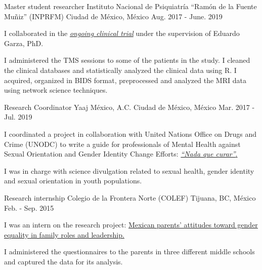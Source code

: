\begin{cventries}
{\begin{cvitems}
            \end{cvitems}
        }
    \cventry
        {Master student researcher}
        {Instituto Nacional de Psiquiatría ``Ramón de la Fuente Muñiz''
        (INPRFM)}
        {Ciudad de México, México}
        {Aug. 2017 - June. 2019}
        {
            \begin{cvitems}
                \item {I collaborated in the \href{https://clinicaltrials.gov/ct2/show/study/NCT02986438?term=Jorge+Gonzalez-Olvera&cntry=MX&rank=2} {\textit{ongoing clinical trial}} under the supervision of Eduardo Garza, PhD.}
                \item {I administered the TMS sessions to some of the patients in the study. I cleaned the clinical databases and statistically analyzed the clinical data using R. I acquired, organized in BIDS format, preprocessed and analyzed the MRI data using network science techniques.}
            \end{cvitems}
        }
    \cventry
        {Research Coordinator}
        {Yaaj México, A.C.}
        {Ciudad de México, México}
        {Mar. 2017 - Jul. 2019}
        {
            \begin{cvitems}
                \item {I coordinated a project in collaboration with United Nations Office on Drugs and Crime (UNODC) to write a guide for professionals of Mental Health against Sexual Orientation and Gender Identity Change Efforts:
                    \href{https://www.unodc.org/documents/mexicoandcentralamerica/2019/GUIAECOSIGFINAL-compressed.pdf}{\textit{``Nada que curar''}.}}
                \item {I was in charge with science divulgation related to sexual health, gender identity and sexual orientation in youth populations.}
            \end{cvitems}
        }
     \cventry
        {Research internship}
        {Colegio de la Frontera Norte (COLEF)}
        {Tijuana, BC, México}
        {Feb. - Sep. 2015}
        {
            \begin{cvitems}
                \item {I was an intern on the research project:
                    \href{https://estudiosdemograficosyurbanos.colmex.mx/index.php/edu/article/view/1791/pdf}{Mexican parents’ attitudes toward gender equality in family roles and leadership.}}
                \item {I administered the questionnaires to the parents in three different middle schools and captured the data for its analysis.}
            \end{cvitems}
        }
\end{cventries}
